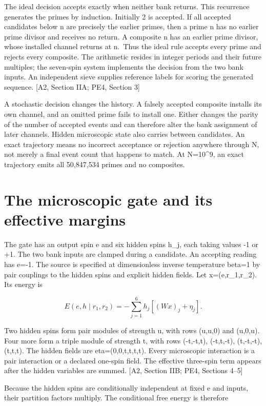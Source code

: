The ideal decision accepts exactly when neither bank returns. This recurrence generates the primes by induction. Initially 2 is accepted. If all accepted candidates below n are precisely the earlier primes, then a prime n has no earlier prime divisor and receives no return. A composite n has an earlier prime divisor, whose installed channel returns at n.~Thus the ideal rule accepts every prime and rejects every composite. The arithmetic resides in integer periods and their future multiples; the seven-spin system implements the decision from the two bank inputs. An independent sieve supplies reference labels for scoring the generated sequence. {[}A2, Section IIA; PE4, Section 3{]}

A stochastic decision changes the history. A falsely accepted composite installs its own channel, and an omitted prime fails to install one. Either changes the parity of the number of accepted events and can therefore alter the bank assignment of later channels. Hidden microscopic state also carries between candidates. An exact trajectory means no incorrect acceptance or rejection anywhere through N, not merely a final event count that happens to match. At N=10\^{}9, an exact trajectory emits all 50,847,534 primes and no composites.

\section{The microscopic gate and its effective margins}\label{the-microscopic-gate-and-its-effective-margins}

The gate has an output spin e and six hidden spins h\_j, each taking values -1 or +1. The two bank inputs are clamped during a candidate. An accepting reading has e=-1. The source is specified at dimensionless inverse temperature beta=1 by pair couplings to the hidden spins and explicit hidden fields. Let x=(e,r\_1,r\_2). Its energy is

\[E(e,h\mid r_1,r_2)=-\sum_{j=1}^{6}h_j[(Wx)_j+\eta_j].\]

Two hidden spins form pair modules of strength u, with rows (u,u,0) and (u,0,u). Four more form a triple module of strength t, with rows (-t,-t,t), (-t,t,-t), (t,-t,-t), (t,t,t). The hidden fields are eta=(0,0,t,t,t,t). Every microscopic interaction is a pair interaction or a declared one-spin field. The effective three-spin term appears after the hidden variables are summed. {[}A2, Section IIB; PE4, Sections 4--5{]}

Because the hidden spins are conditionally independent at fixed e and inputs, their partition factors multiply. The conditional free energy is therefore

